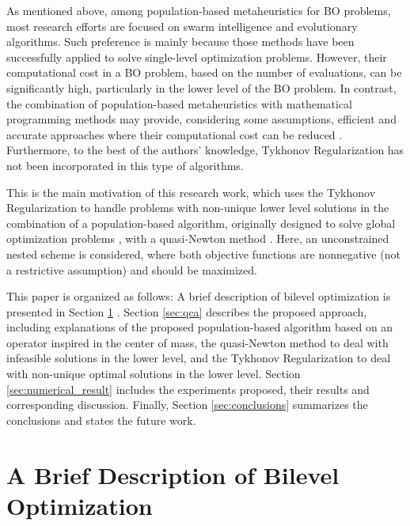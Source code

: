 \documentclass[conference]{IEEEtran}
\theoremstyle{definition}
\begin{document}
As mentioned above, among population-based metaheuristics for BO problems, most
research efforts are focused on swarm intelligence and evolutionary algorithms.
Such preference is mainly because those methods have been successfully applied
to solve single-level optimization problems. However, their computational cost
in a BO problem, based on the number of evaluations, can be significantly high,
particularly in the lower level of the BO problem. In contrast, the combination
of population-based metaheuristics with mathematical programming methods may
provide, considering some assumptions, efficient and accurate approaches where
their computational cost can be reduced \cite{sinha2013efficient,wang2005evolutionary}.
Furthermore, to the best of the authors' knowledge, Tykhonov Regularization has
not been incorporated in this type of algorithms. 

This is the main motivation of this research work, which uses the Tykhonov
Regularization \cite{dempe2002foundations} to handle problems with non-unique
lower level solutions in the combination of a population-based algorithm, originally
designed to solve global optimization problems \cite{Mejia2018}, with a quasi-Newton
method \cite{fletcher2013practical}. Here, an unconstrained nested scheme is
considered, where both objective functions are nonnegative (not a restrictive
assumption) and should be maximized.

This paper is organized as follows: A brief description of bilevel optimization
is presented in Section \ref{sec:a_brief_BO} . Section \ref{sec:qca} describes the proposed
approach, including explanations of the proposed population-based algorithm based
on an operator inspired in the center of mass, the quasi-Newton method to deal
with infeasible solutions in the lower level, and the Tykhonov Regularization to
deal with non-unique optimal solutions in the lower level. Section \ref{sec:numerical_result}
includes the experiments proposed, their results and corresponding discussion.
Finally, Section \ref{sec:conclusions} summarizes the conclusions and states
the future work.


\section{A Brief Description of Bilevel Optimization} %
\label{sec:a_brief_BO}
\end{document}
